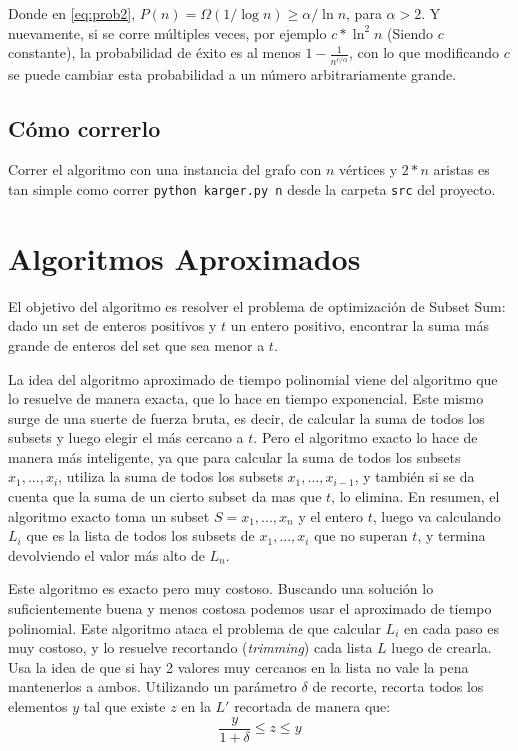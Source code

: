 \documentclass[a4paper,10pt]{article}
\begin{document}
Donde en \ref{eq:prob2}, $P(n) = \Omega(1 / \log n) \geq \alpha / \ln n$, para $\alpha > 2$. Y nuevamente, si se corre múltiples veces, por ejemplo $c*\ln^2 n$ (Siendo $c$ constante), la probabilidad de éxito es al menos $1 - \frac{1}{n^{c/\alpha}}$, con lo que modificando $c$ se puede cambiar esta probabilidad a un número arbitrariamente grande.

\subsection{Cómo correrlo}
Correr el algoritmo con una instancia del grafo con $n$ vértices y $2*n$ aristas es tan simple como correr \texttt{python karger.py n} desde la carpeta \texttt{src} del proyecto.

\section{Algoritmos Aproximados}
El objetivo del algoritmo es resolver el problema de optimización de Subset Sum: dado un set de enteros positivos y $t$ un entero positivo, encontrar la suma más grande de enteros del set que sea menor a $t$.

La idea del algoritmo aproximado de tiempo polinomial viene del algoritmo que lo resuelve de manera exacta, que lo hace en tiempo exponencial. Este mismo surge de una suerte de fuerza bruta, es decir, de calcular la suma de todos los subsets y luego elegir el más cercano a $t$. Pero el algoritmo exacto lo hace de manera más inteligente, ya que para calcular la suma de todos los subsets ${x_1,...,x_i}$, utiliza la suma de todos los subsets ${x_1,...,x_{i-1}}$, y también si se da cuenta que la suma de un cierto subset da mas que $t$, lo elimina. En resumen, el algoritmo exacto toma un subset $S={x_1,...,x_n}$ y el entero $t$, luego va calculando $L_i$ que es la lista de todos los subsets de ${x_1,...,x_i}$ que no superan $t$, y termina devolviendo el valor más alto de $L_n$.

Este algoritmo es exacto pero muy costoso. Buscando una solución lo suficientemente buena y menos costosa podemos usar el aproximado de tiempo polinomial. Este algoritmo ataca el problema de que calcular $L_i$ en cada paso es muy costoso, y lo resuelve recortando (\textit{trimming}) cada lista $L$ luego de crearla. Usa la idea de que si hay 2 valores muy cercanos en la lista no vale la pena mantenerlos a ambos. Utilizando un parámetro $\delta$ de recorte, recorta todos los elementos $y$ tal que existe $z$ en la $L'$ recortada de manera que:
\begin{equation}
	\label{eq:delta}
	\dfrac{y} {1+\delta} \leq z \leq y \tag{3.1}
\end{equation}
\end{document}
